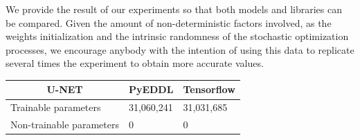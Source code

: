 We provide the result of our experiments so that both models and libraries can be compared. Given the amount of non-deterministic factors involved, as the weights initialization and the intrinsic randomness of the stochastic optimization processes, we encourage anybody with the intention of using this data to replicate several times the experiment to obtain more accurate values.

\vspace{0.75cm}


\begin{table}[!htb]
\centering
\begin{tabular}{l|l|l|}
\cline{2-3}
\multicolumn{1}{c|}{\textbf{U-NET}}                              & \multicolumn{1}{c|}{\textbf{PyEDDL}} & \multicolumn{1}{c|}{\textbf{Tensorflow}} \\ \hline
\multicolumn{1}{|l|}{Trainable parameters}                       &             31,060,241                         &                            31,031,685              \\ \hline
\multicolumn{1}{|l|}{Non-trainable parameters}                   &               0                       &                                    0      \\ \hline


\end{tabular}
\end{table}

